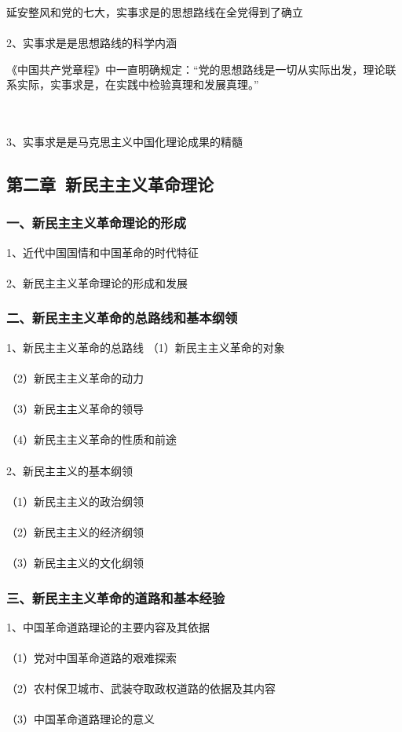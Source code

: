 \documentclass{ctexart}
\begin{document}
延安整风和党的七大，实事求是的思想路线在全党得到了确立
\\\\

2、实事求是是思想路线的科学内涵

《中国共产党章程》中一直明确规定：“党的思想路线是一切从实际出发，理论联系实际，实事求是，在实践中检验真理和发展真理。”


\\\\

3、实事求是是马克思主义中国化理论成果的精髓


\subsection{第二章\ 新民主主义革命理论}
\subsubsection{一、新民主主义革命理论的形成}
1、近代中国国情和中国革命的时代特征
\\\\

2、新民主主义革命理论的形成和发展


\subsubsection{二、新民主主义革命的总路线和基本纲领}
1、新民主主义革命的总路线
（1）新民主主义革命的对象
\\\\
（2）新民主主义革命的动力
\\\\
（3）新民主主义革命的领导
\\\\
（4）新民主主义革命的性质和前途
\\\\

2、新民主主义的基本纲领
\\\\
（1）新民主主义的政治纲领
\\\\
（2）新民主主义的经济纲领
\\\\
（3）新民主主义的文化纲领

\subsubsection{三、新民主主义革命的道路和基本经验}
1、中国革命道路理论的主要内容及其依据
\\\\
（1）党对中国革命道路的艰难探索
\\\\
（2）农村保卫城市、武装夺取政权道路的依据及其内容
\\\\
（3）中国革命道路理论的意义
\\\\
\end{document}
